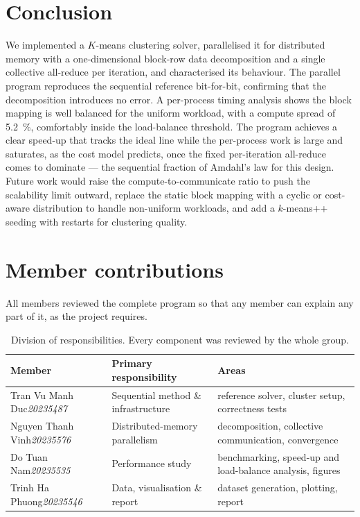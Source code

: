 \documentclass[11pt,a4paper]{article}
\begin{document}
\section{Conclusion}
\label{sec:conclusion}

We implemented a $K$-means clustering solver, parallelised it for distributed
memory with a one-dimensional block-row data decomposition and a single
collective all-reduce per iteration, and characterised its behaviour. The
parallel program reproduces the sequential reference bit-for-bit, confirming that
the decomposition introduces no error. A per-process timing analysis shows the
block mapping is well balanced for the uniform workload, with a compute spread of
\SI{5.2}{\percent}, comfortably inside the load-balance threshold. The program
achieves a clear speed-up that tracks the ideal line while the per-process work
is large and saturates, as the cost model predicts, once the fixed
per-iteration all-reduce comes to dominate --- the sequential fraction of
Amdahl's law for this design. Future work would raise the compute-to-communicate
ratio to push the scalability limit outward, replace the static block mapping
with a cyclic or cost-aware distribution to handle non-uniform workloads, and add
a $k$-means++ seeding with restarts for clustering quality.

\section*{Member contributions}

All members reviewed the complete program so that any member can explain any part
of it, as the project requires.

\begin{table}[H]
\centering
\footnotesize
\setlength{\tabcolsep}{5pt}
\begin{tabular}{@{}p{3.4cm}p{3.9cm}p{6.0cm}@{}}
\toprule
Member & Primary responsibility & Areas \\
\midrule
Tran Vu Manh Duc\newline\textit{20235487} & Sequential method \& infrastructure &
  reference solver, cluster setup, correctness tests \\[4pt]
Nguyen Thanh Vinh\newline\textit{20235576} & Distributed-memory parallelism &
  decomposition, collective communication, convergence \\[4pt]
Do Tuan Nam\newline\textit{20235535} & Performance study &
  benchmarking, speed-up and load-balance analysis, figures \\[4pt]
Trinh Ha Phuong\newline\textit{20235546} & Data, visualisation \& report &
  dataset generation, plotting, report \\
\bottomrule
\end{tabular}
\caption{Division of responsibilities. Every component was reviewed by the whole
group.}
\end{table}
\end{document}
